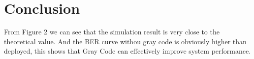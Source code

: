 \documentclass[technicalreport]{ieicej}
\begin{document}
\section{Conclusion}
From Figure 2 we can see that the simulation result is very close to the theoretical value. And the BER curve withou gray code is obviously higher than deployed, this shows that Gray Code can effectively improve system performance.



\end{document}
